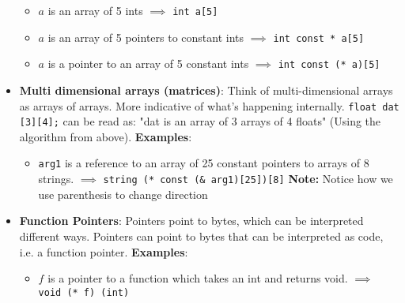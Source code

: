 \documentclass{report}
\begin{document}
\begin{itemize}
\begin{itemize}
                \item $a$ is an array of 5 ints $\implies$ \texttt{int a[5]}
                \item $a$ is an array of 5 pointers to constant ints $\implies$ \texttt{int const * a[5]}
                \item $a$ is a pointer to an array of 5 constant ints $\implies$ \texttt{int const (* a)[5]}
            \end{itemize}
        \item \textbf{Multi dimensional arrays (matrices)}: Think of multi-dimensional arrays as arrays of arrays. More indicative of what's happening internally. \texttt{float dat [3][4];} can be read as: "dat is an array of 3 arrays of 4 floats" (Using the algorithm from above).
            \bigbreak \noindent 
            \textbf{Examples}:
            \begin{itemize}
                \item \texttt{arg1} is a reference to an array of 25 constant pointers to arrays of 8 strings. $\implies$ \texttt{string (* const (\& arg1)[25])[8]}
                    \bigbreak \noindent 
                    \textbf{Note:} Notice how we use parenthesis to change direction
            \end{itemize}
        \item \textbf{Function Pointers}: Pointers point to bytes, which can be interpreted different ways. Pointers can point to bytes that can be interpreted as code, i.e. a function pointer.
            \bigbreak \noindent 
            \textbf{Examples}: 
            \begin{itemize}
                \item $f$ is a pointer to a function which takes an int and returns void. $\implies$ \texttt{void (* f) (int)}
            \end{itemize}
    \end{itemize}

   \pagebreak 
\end{document}
